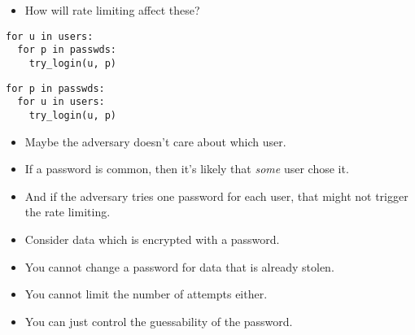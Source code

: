 \begin{frame}[fragile]
  \begin{exercise}
    \begin{itemize}
      \item How will rate limiting affect these?
    \end{itemize}

    \begin{minipage}{0.45\textwidth}
      \begin{lstlisting}
for u in users:
  for p in passwds:
    try_login(u, p)
      \end{lstlisting}
    \end{minipage}
    \hfill
    \begin{minipage}{0.45\textwidth}
      \begin{lstlisting}
for p in passwds:
  for u in users:
    try_login(u, p)
      \end{lstlisting}
    \end{minipage}
  \end{exercise}
\end{frame}

\begin{frame}
  \begin{remark}
    \begin{itemize}
      \item Maybe the adversary doesn't care about which user.
      \item If a password is common, then it's likely that \emph{some} user 
        chose it.
      \item And if the adversary tries one password for each user, that might 
        not trigger the rate limiting.
    \end{itemize}
  \end{remark}
\end{frame}

\begin{frame}
  \begin{remark}[Offline]
    \begin{itemize}
      \item Consider data which is encrypted with a password.
      \item You cannot change a password for data that is already stolen.
      \item You cannot limit the number of attempts either.
      \item You can just control the guessability of the password.
    \end{itemize}
  \end{remark}
\end{frame}

